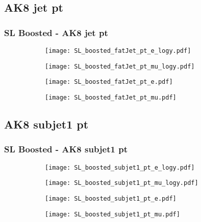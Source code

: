 \documentclass[aspectratio=169,8pt]{beamer}
\begin{document}
\subsection{AK8 jet pt}
\begin{frame}
\frametitle{SL Boosted - AK8 jet pt}
\begin{figure}
\captionsetup[subfigure]{labelformat=empty}
\begin{subfigure}{0.375\textwidth}
\texttt{[image: SL\_boosted\_fatJet\_pt\_e\_logy.pdf]}
\vspace*{-0.15cm}
\end{subfigure}
\hfil
\begin{subfigure}{0.375\textwidth}
\texttt{[image: SL\_boosted\_fatJet\_pt\_mu\_logy.pdf]}
\vspace*{-0.15cm}
\end{subfigure}
\hfil
\begin{subfigure}{0.375\textwidth}
\texttt{[image: SL\_boosted\_fatJet\_pt\_e.pdf]}
\vspace*{-0.15cm}
\end{subfigure}
\hfil
\begin{subfigure}{0.375\textwidth}
\texttt{[image: SL\_boosted\_fatJet\_pt\_mu.pdf]}
\vspace*{-0.15cm}
\end{subfigure}
\hfil
\end{figure}
\end{frame}
\newpage

\subsection{AK8 subjet1 pt}
\begin{frame}
\frametitle{SL Boosted - AK8 subjet1 pt}
\begin{figure}
\captionsetup[subfigure]{labelformat=empty}
\begin{subfigure}{0.375\textwidth}
\texttt{[image: SL\_boosted\_subjet1\_pt\_e\_logy.pdf]}
\vspace*{-0.15cm}
\end{subfigure}
\hfil
\begin{subfigure}{0.375\textwidth}
\texttt{[image: SL\_boosted\_subjet1\_pt\_mu\_logy.pdf]}
\vspace*{-0.15cm}
\end{subfigure}
\hfil
\begin{subfigure}{0.375\textwidth}
\texttt{[image: SL\_boosted\_subjet1\_pt\_e.pdf]}
\vspace*{-0.15cm}
\end{subfigure}
\hfil
\begin{subfigure}{0.375\textwidth}
\texttt{[image: SL\_boosted\_subjet1\_pt\_mu.pdf]}
\vspace*{-0.15cm}
\end{subfigure}
\hfil
\end{figure}
\end{frame}
\newpage
\end{document}
